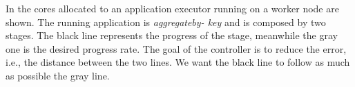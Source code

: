 In  the cores allocated to an application executor running
on a worker node are shown. The running application is \textit{aggregateby-
key} and is composed by two stages. The black line represents the
progress of the stage, meanwhile the gray one is the desired progress
rate. The goal of the controller is to reduce the error, i.e., the distance
between the two lines. We want the black line to follow as much as
possible the gray line.
